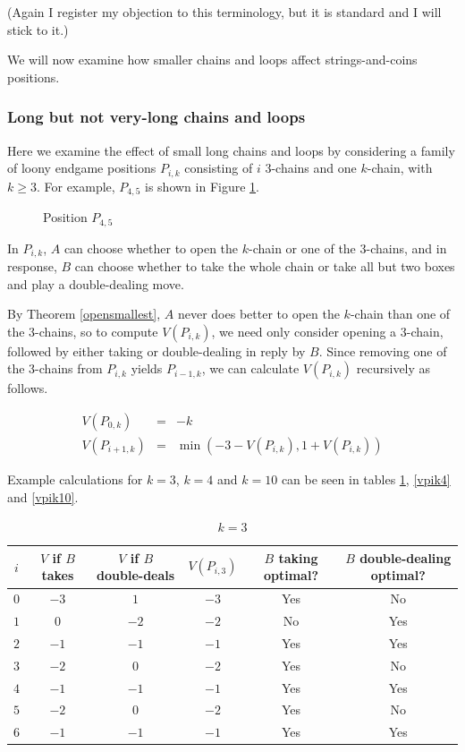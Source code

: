 \documentclass[a4paper,twocolumn]{article}
\begin{document}
(Again I register my objection to this terminology, but it is standard
and I will stick to it.)

We will now examine how smaller chains and loops affect
strings-and-coins positions.

\subsubsection{Long but not very-long chains and loops}

Here we examine the effect of small long chains and loops by
considering a family of loony endgame positions $P_{i,k}$ consisting
of $i$ 3-chains and one $k$-chain, with $k \ge 3$. For example,
$P_{4,5}$ is shown in Figure \ref{p45}.

\begin{figure}
  \centering
  \def\svgscale{0.7}
  
  \caption{Position $P_{4,5}$}
  \label{p45}
\end{figure}

In $P_{i,k}$, $A$ can choose whether to open the $k$-chain or one of
the 3-chains, and in response, $B$ can choose whether to take the
whole chain or take all but two boxes and play a double-dealing move.

By Theorem \ref{opensmallest}, $A$ never does better to open the
$k$-chain than one of the 3-chains, so to compute $V(P_{i,k})$, we
need only consider opening a 3-chain, followed by either taking or
double-dealing in reply by $B$. Since removing one of the 3-chains
from $P_{i,k}$ yields $P_{i-1,k}$, we can calculate $V(P_{i,k})$
recursively as follows.

\begin{eqnarray*}
  V(P_{0,k}) & = & -k \\
  V(P_{i+1,k}) & = & \min(-3-V(P_{i,k}), 1+V(P_{i,k}))
\end{eqnarray*}

Example calculations for $k=3$, $k=4$ and $k=10$ can be seen in tables
\ref{vpik3}, \ref{vpik4} and \ref{vpik10}.

\begin{table}[p]
  \centering
  \begin{tabular}{c c c c c c}
    $i$ & $V$ if $B$ takes & $V$ if $B$ double-deals & $V(P_{i,3})$ & $B$ taking optimal? & $B$ double-dealing optimal? \\
    \hline
    $0$ & $-3$ & $1$ & $-3$ & Yes & No \\
    $1$ & $0$ & $-2$ & $-2$ & No & Yes \\
    $2$ & $-1$ & $-1$ & $-1$ & Yes & Yes \\
    $3$ & $-2$ & $0$ & $-2$ & Yes & No \\
    $4$ & $-1$ & $-1$ & $-1$ & Yes & Yes \\
    $5$ & $-2$ & $0$ & $-2$ & Yes & No \\
    $6$ & $-1$ & $-1$ & $-1$ & Yes & Yes
  \end{tabular}
  \caption{$k=3$}
  \label{vpik3}
\end{table}
\end{document}
